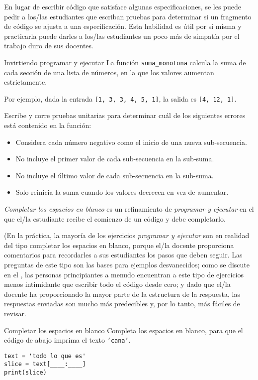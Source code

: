 En lugar de escribir código que satisface algunas especificaciones,  
se les puede pedir a los/las estudiantes que escriban pruebas para determinar si un fragmento de código se ajusta a una especificación. 
Esta habilidad es útil por sí misma y practicarla puede darles a los/las estudiantes un poco más de simpatía por el trabajo duro de sus docentes.

\begin{aside}{Invirtiendo programar y ejecutar}
 La función \texttt{suma\_monotona} calcula la suma de cada sección de una lista de números, en la que los valores aumentan estrictamente.

Por ejemplo,
  dada la entrada \texttt{[1,\ 3,\ 3,\ 4,\ 5,\ 1]},
  la salida es  \texttt{[4,\ 12,\ 1]}.

Escribe y corre pruebas unitarias para determinar cuál de los siguientes errores está contenido en la función:

   \begin{itemize}
  \item
    Considera cada número negativo como el inicio de una nueva sub-secuencia.
  \item
    No incluye el primer valor de cada sub-secuencia en la sub-suma.
  \item
    No incluye el último valor de cada sub-secuencia en la sub-suma.
  \item
    Solo reinicia la suma cuando los valores decrecen en vez de aumentar.
  \end{itemize}
\end{aside}


\emph{Completar los espacios en blanco} es un refinamiento de \emph{programar y ejecutar}
en el que el/la estudiante recibe el comienzo de un código y debe completarlo.

(En la práctica, la mayoría de los ejercicios \emph{programar y ejecutar} son en realidad del tipo completar los espacios en blanco, porque el/la docente proporciona comentarios
para recordarles a sus estudiantes los pasos que deben seguir. 
Las preguntas de este tipo son las bases para ejemplos desvanecidos;
como se discute en el ,
las personas principiantes a menudo encuentran a este tipo de ejercicios  menos intimidante que escribir todo el código desde cero;
y dado que el/la docente ha proporcionado la mayor parte de la estructura de la respuesta,
las respuestas enviadas son mucho más predecibles y, por lo tanto, más fáciles de revisar.

\begin{aside}{Completar los espacios en blanco}
 Completa los espacios en blanco,
 para que el código de abajo imprima el texto  \texttt{'cana'}.

\begin{verbatim}
text = 'todo lo que es'
slice = text[____:____]
print(slice)
\end{verbatim}
\end{aside}

